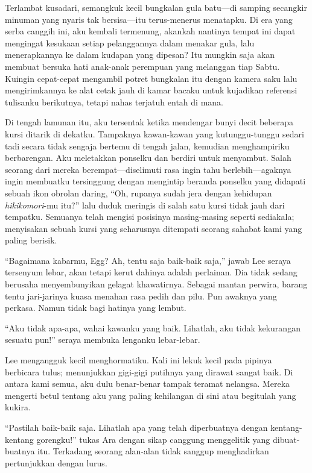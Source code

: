 \documentclass[smalldemyvopaper,11pt,twoside,onecolumn,openright,extrafontsizes]{memoir}
\begin{document}
Terlambat kusadari, semangkuk kecil bungkalan gula batu---di samping secangkir minuman yang nyaris tak bersisa---itu terus-menerus menatapku. Di era yang serba canggih ini, aku kembali termenung, akankah nantinya tempat ini dapat mengingat kesukaan setiap pelanggannya dalam menakar gula, lalu menerapkannya ke dalam kudapan yang dipesan? Itu mungkin saja akan membuat bersuka hati anak-anak perempuan yang melanggan tiap Sabtu. Kuingin cepat-cepat mengambil potret bungkalan itu dengan kamera saku lalu mengirimkannya ke alat cetak jauh di kamar bacaku untuk kujadikan referensi tulisanku berikutnya, tetapi nahas terjatuh entah di mana.


Di tengah lamunan itu, aku tersentak ketika mendengar bunyi decit beberapa kursi ditarik di dekatku. Tampaknya kawan-kawan yang kutunggu-tunggu sedari tadi secara tidak sengaja bertemu di tengah jalan, kemudian menghampiriku berbarengan. Aku meletakkan ponselku dan berdiri untuk menyambut. Salah seorang dari mereka berempat---diselimuti rasa ingin tahu berlebih---agaknya ingin membuatku tersinggung dengan mengintip beranda ponselku yang didapati sebuah ikon obrolan daring, ``Oh, rupanya sudah jera dengan kehidupan \textit{hikikomori}-mu itu?'' lalu duduk meringis di salah satu kursi tidak jauh dari tempatku. Semuanya telah mengisi posisinya masing-masing seperti sediakala; menyisakan sebuah kursi yang seharusnya ditempati seorang sahabat kami yang paling berisik.

``Bagaimana kabarmu, Egg? Ah, tentu saja baik-baik saja,'' jawab Lee seraya tersenyum lebar, akan tetapi kerut dahinya adalah perlainan. Dia tidak sedang berusaha menyembunyikan gelagat khawatirnya. Sebagai mantan perwira, barang tentu jari-jarinya kuasa menahan rasa pedih dan pilu. Pun awaknya yang perkasa. Namun tidak bagi hatinya yang lembut.

``Aku tidak apa-apa, wahai kawanku yang baik. Lihatlah, aku tidak kekurangan sesuatu pun!'' seraya membuka lenganku lebar-lebar.

Lee mengangguk kecil menghormatiku. Kali ini lekuk kecil pada pipinya berbicara tulus; menunjukkan gigi-gigi putihnya yang dirawat sangat baik. Di antara kami semua, aku dulu benar-benar tampak teramat nelangsa. Mereka mengerti betul tentang aku yang paling kehilangan di sini atau begitulah yang kukira.

``Pastilah baik-baik saja. Lihatlah apa yang telah diperbuatnya dengan kentang-kentang gorengku!'' tukas Ara dengan sikap canggung menggelitik yang dibuat-buatnya itu. Terkadang seorang alan-alan tidak sanggup menghadirkan pertunjukkan dengan lurus.
\end{document}
